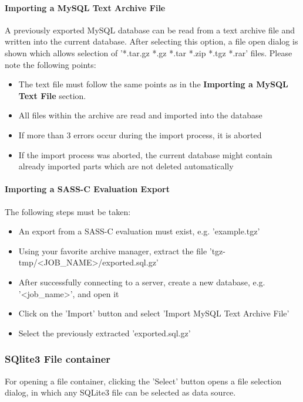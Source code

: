 \documentclass[10pt,letterpaper,extrafontsizes]{memoir}
\begin{document}
\paragraph{Importing a MySQL Text Archive File}

A previously exported MySQL database can be read from a text archive file and written into the current database. After selecting this option, a file open dialog is shown which allows selection of '*.tar.gz *.gz *.tar *.zip *.tgz *.rar' files. Please note the following points:

\begin{itemize}  
\item The text file must follow the same points as in the \textbf{Importing a MySQL Text File} section.
\item All files within the archive are read and imported into the database
\item If more than 3 errors occur during the import process, it is aborted
\item If the import process was aborted, the current database might contain already imported parts which are not deleted automatically
\end{itemize}

\paragraph{Importing a SASS-C Evaluation Export}

The following steps must be taken:

\begin{itemize}  
\item An export from a SASS-C evaluation must exist, e.g. 'example.tgz'
\item Using your favorite archive manager, extract the file 'tgz-tmp/<JOB\_NAME>/exported.sql.gz'
\item After successfully connecting to a server, create a new database, e.g. '<job\_name>', and open it
\item Click on the 'Import' button and select 'Import MySQL Text Archive File'
\item Select the previously extracted 'exported.sql.gz'
\end{itemize}

\subsubsection{SQlite3 File container}
For opening a file container, clicking the 'Select' button opens a file selection dialog, in which any SQLite3 file can be selected as data source.
\end{document}
